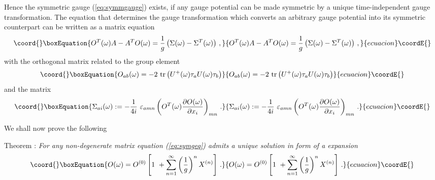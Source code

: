 \documentclass[a4paper,12pt]{article}
\begin{document}
Hence the symmetric gauge (\ref{eq:symmgauge}) exists, if any gauge potential
\coordHE{} can be made symmetric by a unique time-independent gauge transformation.
The equation that determines the gauge transformation \coordHE{} which converts
an arbitrary gauge potential \coordHE{} into its symmetric counterpart
can be written as a matrix equation
\begin{equation}\coord{}\boxEquation{
\label{eq:symgeq}
O^T(\omega)A-A^TO(\omega) = \frac{1}{g}\left(\Sigma(\omega)
                           -\Sigma^T(\omega)\right)\,,
}{
O^T(\omega)A-A^TO(\omega) = \frac{1}{g}\left(\Sigma(\omega)
                           -\Sigma^T(\omega)\right)\,,
}{ecuacion}\coordE{}\end{equation}
with the orthogonal \coordHE{} matrix related to the \coordHE{} group element
\begin{equation}\coord{}\boxEquation{\label{eq:ort}
O_{ab}(\omega) =
- 2\ \mbox{tr} \left(U^+(\omega)\tau_a U(\omega)\tau_b\right)
}{O_{ab}(\omega) =
- 2\ \mbox{tr} \left(U^+(\omega)\tau_a U(\omega)\tau_b\right)
}{ecuacion}\coordE{}\end{equation}
and the \coordHE{} matrix \myHighlight{$\Sigma$}\coordHE{}
\begin{equation}\coord{}\boxEquation{
\label{eq:Omega}
\Sigma_{ai}(\omega):= - \frac{1}{4 i}
\ \varepsilon_{amn}\left(O^T(\omega)
\frac{\partial O(\omega)}{\partial x_i}\right)_{mn}\,.
}{
\Sigma_{ai}(\omega):= - \frac{1}{4 i}
\ \varepsilon_{amn}\left(O^T(\omega)
\frac{\partial O(\omega)}{\partial x_i}\right)_{mn}\,.
}{ecuacion}\coordE{}\end{equation}

We shall now prove the following

{\sf Theorem} :
\emph{ For any non-degenerate matrix \coordHE{}
equation (\ref{eq:symgeq}) admits a unique solution
in form of a \coordHE{} expansion}
\begin{equation}\coord{}\boxEquation{
\label{eq:1gsol}
O(\omega) = O^{(0)}\left[1\ +\sum_{n=1}^{\infty}
\left(\frac{1}{g}\right)^n X^{(n)}\right]\,.
}{
O(\omega) = O^{(0)}\left[1\ +\sum_{n=1}^{\infty}
\left(\frac{1}{g}\right)^n X^{(n)}\right]\,.
}{ecuacion}\coordE{}\end{equation}
\end{document}
